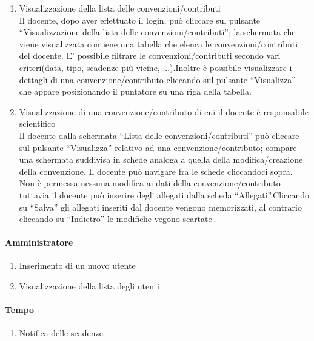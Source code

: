 \begin{enumerate}
 
 \item Visualizzazione della lista delle convenzioni/contributi\\
 
 Il docente, dopo aver effettuato il login, può cliccare sul pulsante ``Visualizzazione della lista delle convenzioni/contributi''; la schermata
 che viene visualizzata contiene una tabella che elenca le convenzioni/contributi del docente. E' possibile filtrare le convenzioni/contributi
 secondo vari criteri(data, tipo, scadenze più vicine, ...).Inoltre è possibile visualizzare i dettagli di una convenzione/contributo cliccando sul
 pulsante ``Visualizza'' che appare posizionando il puntatore su una riga della tabella.
 
 \item Visualizzazione di una convenzione/contributo di cui il docente è responsabile scientifico\\
 Il docente dalla schermata ``Lista delle convenzioni/contributi'' può cliccare sul pulsante ``Visualizza'' relativo ad una convenzione/contributo; compare una schermata suddivisa in schede analoga a quella della modifica/creazione
 della convenzione. Il docente può navigare fra le schede cliccandoci sopra. Non è permessa nessuna modifica ai dati della convenzione/contributo tuttavia il docente può inserire degli allegati dalla scheda ``Allegati''.Cliccando su ``Salva''
 gli allegati inseriti dal docente vengono memorizzati, al contrario cliccando su ``Indietro'' le modifiche vegono scartate .
 
 
 
\end{enumerate}



\paragraph{Amministratore}
\begin{enumerate}
 \item Inserimento di un nuovo utente
 \item Visualizzazione della lista degli utenti
\end{enumerate}

\paragraph{Tempo}
\begin{enumerate}
 \item Notifica delle scadenze
\end{enumerate}




